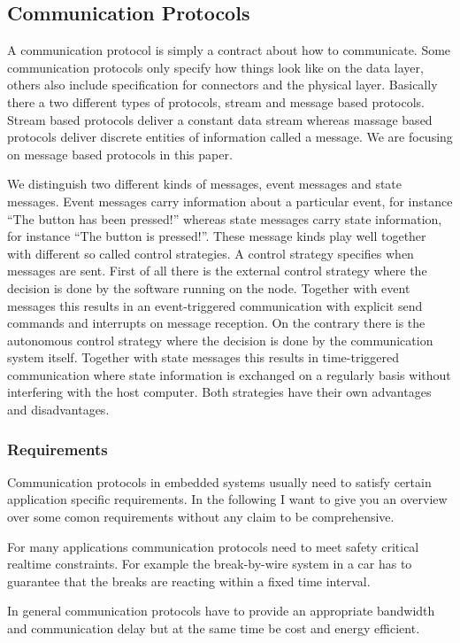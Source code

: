 \documentclass[pdftex,12pt,a4paper,fleqn]{scrartcl}
\begin{document}
\subsection{Communication Protocols}
A communication protocol is simply a contract about how to communicate. Some communication protocols only specify how things look like on the data layer, others also include specification for connectors and the physical layer. Basically there a two different types of protocols, stream and message based protocols. Stream based protocols deliver a constant data stream whereas massage based protocols deliver discrete entities of information called a message. We are focusing on message based protocols in this paper.

We distinguish two different kinds of messages, event messages and state messages. Event messages carry information about a particular event, for instance \enquote{The button has been pressed!} whereas state messages carry state information, for instance \enquote{The button is pressed!}. These message kinds play well together with different so called control strategies. A control strategy specifies when messages are sent. First of all there is the external control strategy where the decision is done by the software running on the node. Together with event messages this results in an event-triggered communication with explicit send commands and interrupts on message reception. On the contrary there is the autonomous control strategy where the decision is done by the communication system itself. Together with state messages this results in time-triggered communication where state information is exchanged on a regularly basis without interfering with the host computer. Both strategies have their own advantages and disadvantages.

\subsubsection{Requirements}
Communication protocols in embedded systems usually need to satisfy certain application specific requirements. In the following I want to give you an overview over some comon requirements without any claim to be comprehensive.

For many applications communication protocols need to meet safety critical realtime constraints. For example the break-by-wire system in a car has to guarantee that the breaks are reacting within a fixed time interval. 

In general communication protocols have to provide an appropriate bandwidth and communication delay but at the same time be cost and energy efficient.
\end{document}
